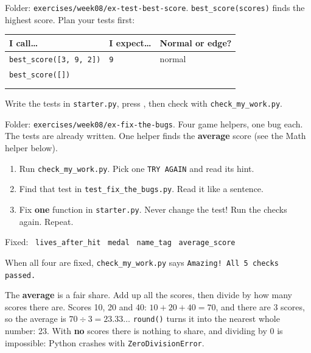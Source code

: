 \begin{exercise}
Folder: \texttt{exercises/week08/ex-test-best-score}. \texttt{best\_score(scores)} finds the highest score. Plan your tests first:
\begin{center}
\renewcommand{\arraystretch}{1.9}
\begin{tabular}{@{}p{5.6cm}p{3.6cm}p{3.4cm}@{}}
\toprule
\textbf{I call\ldots} & \textbf{I expect\ldots} & \textbf{Normal or edge?} \\ \midrule
\texttt{best\_score([3, 9, 2])} & \texttt{9} & normal \\ \midrule
\texttt{best\_score([])} & & \\ \midrule
& & \\ \midrule
& & \\
\bottomrule
\end{tabular}
\end{center}
Write the tests in \texttt{starter.py}, press , then check with \texttt{check\_my\_work.py}.
\end{exercise}

\begin{exercise}
Folder: \texttt{exercises/week08/ex-fix-the-bugs}. Four game helpers, one bug each. The tests are already written.
One helper finds the \textbf{average} score (see the Math helper below).
\begin{enumerate}[leftmargin=1.4em]
  \item Run \texttt{check\_my\_work.py}. Pick one \texttt{TRY AGAIN} and read its hint.
  \item Find that test in \texttt{test\_fix\_the\_bugs.py}. Read it like a sentence.
  \item Fix \textbf{one} function in \texttt{starter.py}. Never change the test! Run the checks again. Repeat.
\end{enumerate}
Fixed: \tickbox\ \texttt{lives\_after\_hit} \quad \tickbox\ \texttt{medal} \quad \tickbox\ \texttt{name\_tag} \quad \tickbox\ \texttt{average\_score}
\par When all four are fixed, \texttt{check\_my\_work.py} says \texttt{Amazing! All 5 checks passed.}
\end{exercise}

\begin{tip}
The \textbf{average} is a fair share. Add up all the scores, then divide by how many scores there are.
Scores 10, 20 and 40: $10 + 20 + 40 = 70$, and there are 3 scores, so the average is $70 \div 3 = 23.33\ldots$
\texttt{round()} turns it into the nearest whole number: 23.
With \textbf{no} scores there is nothing to share, and dividing by 0 is impossible: Python crashes with \texttt{ZeroDivisionError}.
\end{tip}

